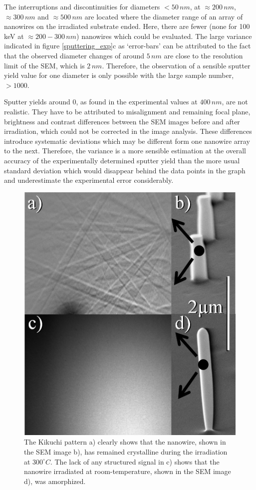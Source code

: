 The interruptions and discontinuities for diameters $<50\,nm$, at $\approx 200\,nm$, $\approx 300\,nm$ and $\approx 500\,nm$ are located where the diameter range of an array of nanowires on the irradiated substrate ended. Here, there are fewer (none for 100\,keV at $\approx 200 - 300\,nm$) nanowires which could be evaluated. The large variance indicated in figure \ref{sputtering_exp}c as `error-bars' can be attributed to the fact that the observed diameter changes of around $5\,nm$ are close to the resolution limit of the SEM, which is $2\,nm$. Therefore, the observation of a sensible sputter yield value for one diameter is only possible with the large sample number, $>1000$.

Sputter yields around 0, as found in the experimental values at $400\,nm$, are not realistic. They have to be attributed to misalignment and remaining focal plane, brightness and contrast differences between the SEM images before and after irradiation, which could not be corrected in the image analysis. These differences introduce systematic deviations which may be different form one nanowire array to the next. Therefore, the variance is a more sensible estimation at the overall accuracy of the experimentally determined sputter yield than the more usual standard deviation which would disappear behind the data points in the graph and underestimate the experimental error considerably.

\begin{figure}
	\centering
		\includegraphics[width=.3\textwidth]{images/EBSD.jpg}
	\caption{The Kikuchi pattern a) clearly shows that the nanowire, shown in the SEM image b), has remained crystalline during the irradiation at $300^\circ C$. The lack of any structured signal in c) shows that the nanowire irradiated at room-temperature, shown in the SEM image d), was amorphized.} 
	\label{EBSD}
\end{figure}

